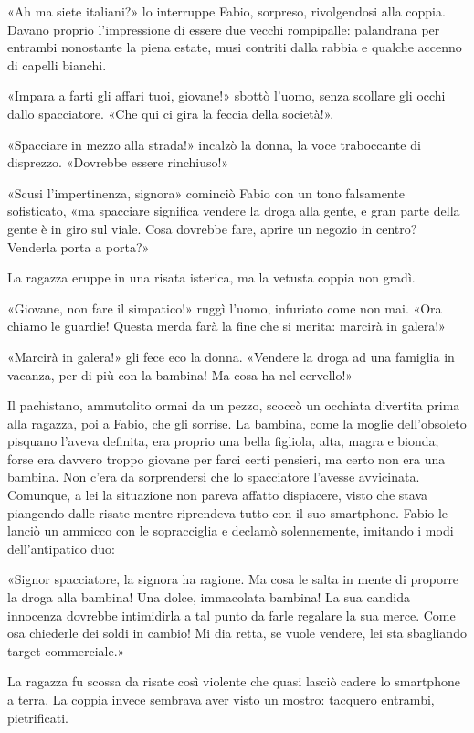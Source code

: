 «Ah ma siete italiani?» lo interruppe Fabio, sorpreso, rivolgendosi alla coppia. Davano proprio l'impressione di essere due vecchi rompipalle: palandrana per entrambi nonostante la piena estate, musi contriti dalla rabbia e qualche accenno di capelli bianchi.

«Impara a farti gli affari tuoi, giovane!» sbottò l'uomo, senza scollare gli occhi dallo spacciatore. «Che qui ci gira la feccia della società!».

«Spacciare in mezzo alla strada!» incalzò la donna, la voce traboccante di disprezzo. «Dovrebbe essere rinchiuso!»

«Scusi l'impertinenza, signora» cominciò Fabio con un tono falsamente sofisticato, «ma spacciare significa vendere la droga alla gente, e gran parte della gente è in giro sul viale. Cosa dovrebbe fare, aprire un negozio in centro? Venderla porta a porta?»

La ragazza eruppe in una risata isterica, ma la vetusta coppia non gradì.

«Giovane, non fare il simpatico!» ruggì l'uomo, infuriato come non mai. «Ora chiamo le guardie! Questa merda farà la fine che si merita: marcirà in galera!»

«Marcirà in galera!» gli fece eco la donna. «Vendere la droga ad una famiglia in vacanza, per di più con la bambina! Ma cosa ha nel cervello!»

Il pachistano, ammutolito ormai da un pezzo, scoccò un occhiata divertita prima alla ragazza, poi a Fabio, che gli sorrise. La bambina, come la moglie dell'obsoleto pisquano l'aveva definita, era proprio una bella figliola, alta, magra e bionda; forse era davvero troppo giovane per farci certi pensieri, ma certo non era una bambina. Non c'era da sorprendersi che lo spacciatore l'avesse avvicinata. Comunque, a lei la situazione non pareva affatto dispiacere, visto che stava piangendo dalle risate mentre riprendeva tutto con il suo smartphone. Fabio le lanciò un ammicco con le sopracciglia e declamò solennemente, imitando i modi dell'antipatico duo:

«Signor spacciatore, la signora ha ragione. Ma cosa le salta in mente di proporre la droga alla bambina! Una dolce, immacolata bambina! La sua candida innocenza dovrebbe intimidirla a tal punto da farle regalare la sua merce. Come osa chiederle dei soldi in cambio! Mi dia retta, se vuole vendere, lei sta sbagliando target commerciale.»

La ragazza fu scossa da risate così violente che quasi lasciò cadere lo smartphone a terra. La coppia invece sembrava aver visto un mostro: tacquero entrambi, pietrificati.

